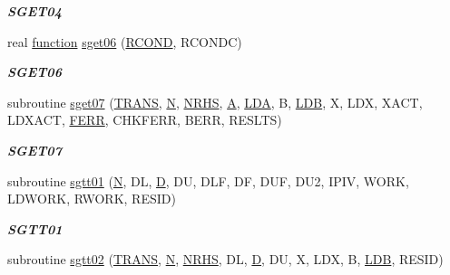 \begin{DoxyCompactItemize}
\begin{DoxyCompactList}\small\item\em {\bfseries S\+G\+E\+T04} \end{DoxyCompactList}\item 
real \hyperlink{afunc_8m_a7b5e596df91eadea6c537c0825e894a7}{function} \hyperlink{group__single__lin_gad72dcf0331f6154f59b0b37004178b97}{sget06} (\hyperlink{superlu__enum__consts_8h_af00a42ecad444bbda75cde1b64bd7e72a9b5c151728d8512307565994c89919d5}{R\+C\+O\+N\+D}, R\+C\+O\+N\+D\+C)
\begin{DoxyCompactList}\small\item\em {\bfseries S\+G\+E\+T06} \end{DoxyCompactList}\item 
subroutine \hyperlink{group__single__lin_gada87bbf36f54bc1181668b3b7285d0c5}{sget07} (\hyperlink{superlu__enum__consts_8h_a0c4e17b2d5cea33f9991ccc6a6678d62a1f61e3015bfe0f0c2c3fda4c5a0cdf58}{T\+R\+A\+N\+S}, \hyperlink{polmisc_8c_a0240ac851181b84ac374872dc5434ee4}{N}, \hyperlink{example__user_8c_aa0138da002ce2a90360df2f521eb3198}{N\+R\+H\+S}, \hyperlink{classA}{A}, \hyperlink{example__user_8c_ae946da542ce0db94dced19b2ecefd1aa}{L\+D\+A}, B, \hyperlink{example__user_8c_a50e90a7104df172b5a89a06c47fcca04}{L\+D\+B}, X, L\+D\+X, X\+A\+C\+T, L\+D\+X\+A\+C\+T, \hyperlink{superlu__enum__consts_8h_af00a42ecad444bbda75cde1b64bd7e72a78fd14d7abebae04095cfbe02928f153}{F\+E\+R\+R}, C\+H\+K\+F\+E\+R\+R, B\+E\+R\+R, R\+E\+S\+L\+T\+S)
\begin{DoxyCompactList}\small\item\em {\bfseries S\+G\+E\+T07} \end{DoxyCompactList}\item 
subroutine \hyperlink{group__single__lin_gad49bd4e74626aa703bf65ec37293f73a}{sgtt01} (\hyperlink{polmisc_8c_a0240ac851181b84ac374872dc5434ee4}{N}, D\+L, \hyperlink{odrpack_8h_a7dae6ea403d00f3687f24a874e67d139}{D}, D\+U, D\+L\+F, D\+F, D\+U\+F, D\+U2, I\+P\+I\+V, W\+O\+R\+K, L\+D\+W\+O\+R\+K, R\+W\+O\+R\+K, R\+E\+S\+I\+D)
\begin{DoxyCompactList}\small\item\em {\bfseries S\+G\+T\+T01} \end{DoxyCompactList}\item 
subroutine \hyperlink{group__single__lin_ga3073c395aa9e0f990c0fffe536d07d69}{sgtt02} (\hyperlink{superlu__enum__consts_8h_a0c4e17b2d5cea33f9991ccc6a6678d62a1f61e3015bfe0f0c2c3fda4c5a0cdf58}{T\+R\+A\+N\+S}, \hyperlink{polmisc_8c_a0240ac851181b84ac374872dc5434ee4}{N}, \hyperlink{example__user_8c_aa0138da002ce2a90360df2f521eb3198}{N\+R\+H\+S}, D\+L, \hyperlink{odrpack_8h_a7dae6ea403d00f3687f24a874e67d139}{D}, D\+U, X, L\+D\+X, B, \hyperlink{example__user_8c_a50e90a7104df172b5a89a06c47fcca04}{L\+D\+B}, R\+E\+S\+I\+D)

\end{DoxyCompactItemize}
